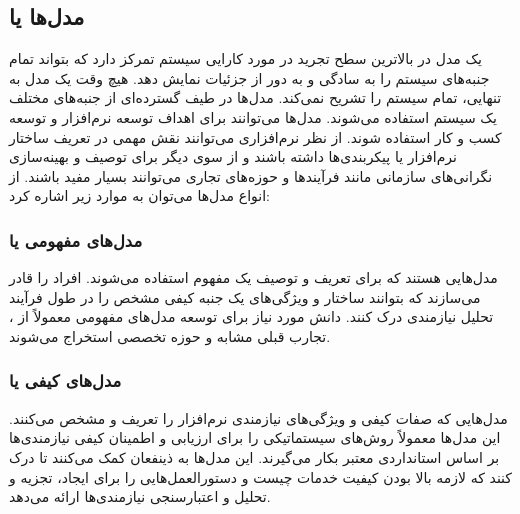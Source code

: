 \subsection{مدل‌ها یا }

یک مدل در بالاترین سطح تجرید در مورد کارایی سیستم تمرکز دارد که بتواند تمام
جنبه‌های سیستم را به سادگی و به دور از جزئیات نمایش دهد. هیچ وقت یک مدل به
تنهایی، تمام سیستم را تشریح نمی‌کند. مدل‌ها در طیف گسترده‌ای از جنبه‌های مختلف
یک سیستم استفاده می‌شوند. مدل‌ها می‌توانند برای اهداف توسعه نرم‌افزار و توسعه
کسب و کار استفاده شوند. از نظر نرم‌افزاری می‌توانند نقش مهمی در تعریف ساختار
نرم‌افزار یا پیکربندی‌ها داشته باشند و از سوی دیگر برای توصیف و بهینه‌سازی
نگرانی‌های سازمانی مانند فرآیندها و حوزه‌های تجاری می‌توانند بسیار مفید باشند.
از انواع مدل‌ها می‌توان به موارد زیر اشاره کرد:

\subsubsection{مدل‌های مفهومی یا }

مدل‌هایی هستند که برای تعریف و توصیف یک مفهوم استفاده می‌شوند. افراد را قادر
می‌سازند که بتوانند ساختار و ویژگی‌های یک جنبه کیفی مشخص را در طول فرآیند تحلیل
نیازمندی درک کنند. دانش مورد نیاز برای توسعه مدل‌های مفهومی معمولاً از
، تجارب قبلی مشابه و حوزه تخصصی استخراج می‌شوند.

\subsubsection{مدل‌های کیفی یا }

مدل‌هایی که صفات کیفی و ویژگی‌های نیازمندی نرم‌افزار را تعریف و مشخص می‌کنند.
این مدل‌ها معمولاً روش‌های سیستماتیکی را برای ارزیابی و اطمینان کیفی نیازمندی‌ها
بر اساس استانداردی معتبر بکار می‌گیرند. این مدل‌ها به ذینفعان کمک می‌کنند تا درک
کنند که لازمه بالا بودن کیفیت خدمات چیست و دستورالعمل‌هایی را برای ایجاد، تجزیه
و تحلیل و اعتبارسنجی نیازمندی‌ها ارائه می‌دهد.

